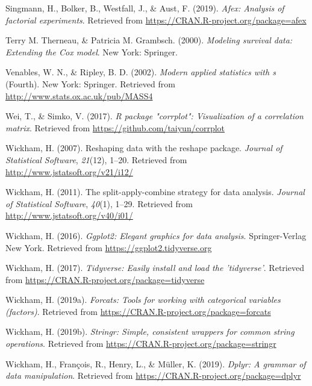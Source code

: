 \documentclass[
  english,
  man]{apa6}
\begin{document}
\leavevmode\hypertarget{ref-R-afex}{}%
Singmann, H., Bolker, B., Westfall, J., \& Aust, F. (2019). \emph{Afex: Analysis of factorial experiments}. Retrieved from \url{https://CRAN.R-project.org/package=afex}

\leavevmode\hypertarget{ref-R-survival-book}{}%
Terry M. Therneau, \& Patricia M. Grambsch. (2000). \emph{Modeling survival data: Extending the Cox model}. New York: Springer.

\leavevmode\hypertarget{ref-R-MASS}{}%
Venables, W. N., \& Ripley, B. D. (2002). \emph{Modern applied statistics with s} (Fourth). New York: Springer. Retrieved from \url{http://www.stats.ox.ac.uk/pub/MASS4}

\leavevmode\hypertarget{ref-R-corrplot2017}{}%
Wei, T., \& Simko, V. (2017). \emph{R package "corrplot": Visualization of a correlation matrix}. Retrieved from \url{https://github.com/taiyun/corrplot}

\leavevmode\hypertarget{ref-R-reshape2}{}%
Wickham, H. (2007). Reshaping data with the reshape package. \emph{Journal of Statistical Software}, \emph{21}(12), 1--20. Retrieved from \url{http://www.jstatsoft.org/v21/i12/}

\leavevmode\hypertarget{ref-R-plyr}{}%
Wickham, H. (2011). The split-apply-combine strategy for data analysis. \emph{Journal of Statistical Software}, \emph{40}(1), 1--29. Retrieved from \url{http://www.jstatsoft.org/v40/i01/}

\leavevmode\hypertarget{ref-R-ggplot2}{}%
Wickham, H. (2016). \emph{Ggplot2: Elegant graphics for data analysis}. Springer-Verlag New York. Retrieved from \url{https://ggplot2.tidyverse.org}

\leavevmode\hypertarget{ref-R-tidyverse}{}%
Wickham, H. (2017). \emph{Tidyverse: Easily install and load the 'tidyverse'}. Retrieved from \url{https://CRAN.R-project.org/package=tidyverse}

\leavevmode\hypertarget{ref-R-forcats}{}%
Wickham, H. (2019a). \emph{Forcats: Tools for working with categorical variables (factors)}. Retrieved from \url{https://CRAN.R-project.org/package=forcats}

\leavevmode\hypertarget{ref-R-stringr}{}%
Wickham, H. (2019b). \emph{Stringr: Simple, consistent wrappers for common string operations}. Retrieved from \url{https://CRAN.R-project.org/package=stringr}

\leavevmode\hypertarget{ref-R-dplyr}{}%
Wickham, H., François, R., Henry, L., \& Müller, K. (2019). \emph{Dplyr: A grammar of data manipulation}. Retrieved from \url{https://CRAN.R-project.org/package=dplyr}
\end{document}

